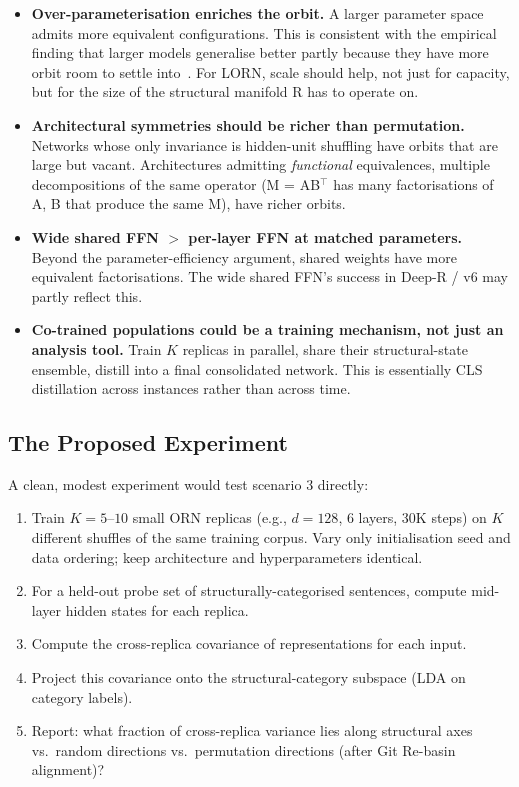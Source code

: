 \documentclass[11pt, a4paper]{article}
\theoremstyle{plain}
\theoremstyle{definition}
\theoremstyle{remark}
\begin{document}
\begin{itemize}[nosep]
\item \textbf{Over-parameterisation enriches the orbit.} A larger parameter space admits more equivalent configurations.
This is consistent with the empirical finding that larger models generalise better partly because they have more orbit room to settle into~\cite{soudry2018implicit}.
For LORN, scale should help, not just for capacity, but for the size of the structural manifold R has to operate on.

\item \textbf{Architectural symmetries should be richer than permutation.}
Networks whose only invariance is hidden-unit shuffling have orbits that are large but vacant.
Architectures admitting \emph{functional} equivalences, multiple decompositions of the same operator (M = AB$^\top$ has many factorisations of A, B that produce the same M), have richer orbits.

\item \textbf{Wide shared FFN $>$ per-layer FFN at matched parameters.}
Beyond the parameter-efficiency argument, shared weights have more equivalent factorisations.
The wide shared FFN's success in Deep-R / v6 may partly reflect this.

\item \textbf{Co-trained populations could be a training mechanism, not just an analysis tool.}
Train $K$ replicas in parallel, share their structural-state ensemble, distill into a final consolidated network.
This is essentially CLS distillation across instances rather than across time.
\end{itemize}

\subsection{The Proposed Experiment}

A clean, modest experiment would test scenario 3 directly:

\begin{enumerate}[nosep]
\item Train $K = 5$--$10$ small ORN replicas (e.g., $d{=}128$, 6 layers, 30K steps) on $K$ different shuffles of the same training corpus. Vary only initialisation seed and data ordering; keep architecture and hyperparameters identical.
\item For a held-out probe set of structurally-categorised sentences, compute mid-layer hidden states for each replica.
\item Compute the cross-replica covariance of representations for each input.
\item Project this covariance onto the structural-category subspace (LDA on category labels).
\item Report: what fraction of cross-replica variance lies along structural axes vs.\ random directions vs.\ permutation directions (after Git Re-basin alignment)?
\end{enumerate}
\end{document}
